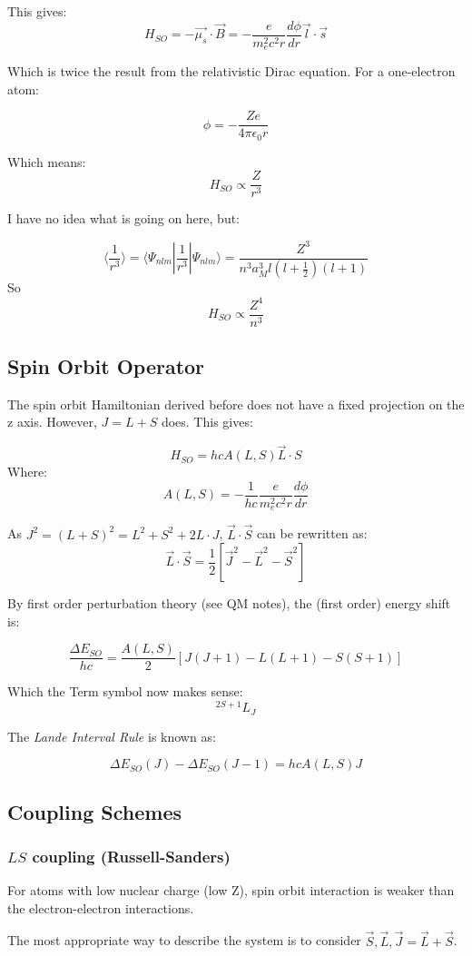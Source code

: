 \documentclass[12pt]{article}
\begin{document}
This gives:
\[H_{SO} = -\vec{\mu_s}\cdot\vec{B} = -\frac{e}{m^2_ec^2 r}\frac{d\phi}{dr}{\vec{l}\cdot \vec{s}}\]

Which is twice the result from the relativistic Dirac equation. For a one-electron atom:

\[\phi = -\frac{Ze}{4\pi\epsilon_0 r}\]

Which means:
\[H_{SO} \propto \frac{Z}{r^3}\]

I have no idea what is going on here, but:

\[ \langle \frac{1}{r^3} \rangle = \langle \Psi_{nlm} | \frac1{r^3} |\Psi_{nlm}\rangle = \frac{Z^3}{n^3a^3_Ml(l+\frac12)(l+1)}\]
So
\[H_{SO} \propto \frac{Z^4}{n^3}\]

\subsection{Spin Orbit Operator}
The spin orbit Hamiltonian derived before does not have a fixed projection on the z axis. However, $J=L+S$ does. This gives:

\[H_{SO} = hc A(L,S) \vec{L} \cdot {S}\]
Where:
\[A(L,S) = -\frac{1}{hc}\frac{e}{m^2_ec^2 r}\frac{d\phi}{dr}\]

As $J^2 = (L+S)^2 = L^2+S^2+2L\cdot J$, $\vec{L}\cdot\vec{S}$ can be rewritten as:
\[ \vec{L}\cdot\vec{S} = \frac12 [\vec{J}^2 - \vec{L}^2 - \vec{S}^2]\]

By first order perturbation theory (see QM notes), the (first order) energy shift is:

\[\frac{\Delta E_{SO}}{hc} = \frac{A(L,S)}{2}[J(J+1) - L(L+1) - S(S+1)]\]

Which the Term symbol now makes sense:
\[ ^{2S+1}L_J\]

The \textit{Lande Interval Rule} is known as:

\[\Delta E_{SO}(J) - \Delta E_{SO}(J-1) = hc A(L,S) J\]

\subsection{Coupling Schemes}
\subsubsection{$LS$ coupling (Russell-Sanders)}

For atoms with low nuclear charge (low Z), spin orbit interaction is weaker than the electron-electron interactions.

The most appropriate way to describe the system is to consider $\vec{S}, \vec{L}, \vec{J} = \vec{L}+\vec{S}$.  
\end{document}
